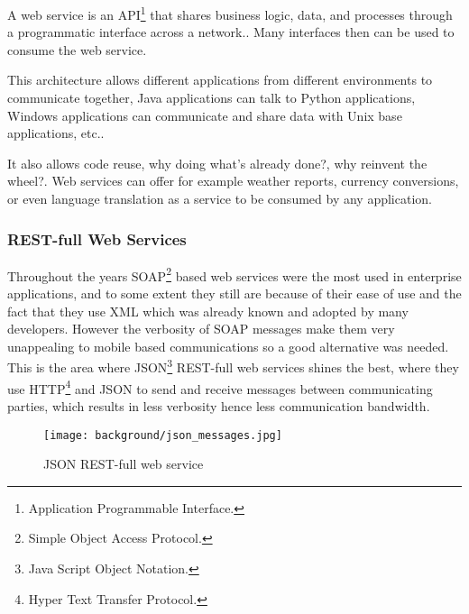 A web service is an API\footnote{Application Programmable Interface.} that shares business logic, data, and processes through a programmatic interface across a network.\cite{webo}. Many interfaces then can be used to consume the web service.

This architecture allows different applications from different environments to communicate together, Java applications can talk to Python applications, Windows applications can communicate and share data with Unix base applications, etc.. 

It also allows code reuse, why doing what's already done?, why reinvent the wheel?. Web services can offer for example weather reports, currency conversions, or even language translation as a service to be consumed by any application.

\subsubsection{REST-full Web Services}
	Throughout the years SOAP\footnote{Simple Object Access Protocol.} based web services were the most used in enterprise applications, and to some extent they still are because of their ease of use and the fact that they use XML which was already known and adopted by many developers. However the verbosity of SOAP messages make them very unappealing to mobile based communications so a good alternative was needed. This is the area where JSON\footnote{Java Script Object Notation.} REST-full web services shines the best, where they use HTTP\footnote{Hyper Text Transfer Protocol.} and JSON to send and receive messages between communicating parties, which results in less verbosity hence less communication bandwidth.
	\begin{figure}[ht]
		\centering
		\texttt{[image: background/json\_messages.jpg]}
		\caption{JSON REST-full web service}
	\end{figure}